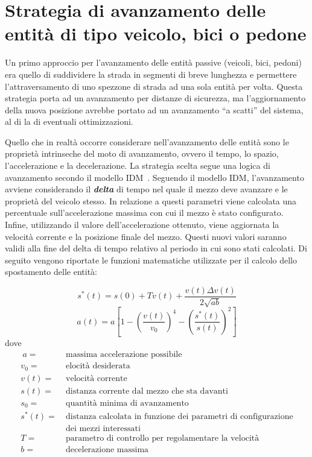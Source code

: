 \section{Strategia di avanzamento delle entità di tipo veicolo, bici o pedone}
Un primo approccio per l'avanzamento delle entità passive (veicoli, bici,
pedoni) era quello di suddividere la strada in segmenti di breve lunghezza e
permettere l'attraversamento di uno spezzone di strada ad una sola entità per
volta.
Questa strategia porta ad un avanzamento per distanze di sicurezza, ma
l'aggiornamento della nuova posizione avrebbe portato ad un avanzamento ``a
scatti'' del sistema, al di la di eventuali ottimizzazioni.

Quello che in realtà occorre considerare nell'avanzamento delle entità sono le
proprietà intrinseche del moto di avanzamento, ovvero il tempo, lo spazio,
l'accelerazione e la decelerazione. La strategia scelta segue una logica di
avanzamento secondo il modello \ac{IDM}~\cite{treiber2000microscopic}.
Seguendo il modello \ac{IDM}, l'avanzamento avviene considerando il
\textbf{\textit{delta}} di tempo nel quale il mezzo deve avanzare e le proprietà
del veicolo stesso. In relazione a questi parametri viene calcolata una
percentuale sull'accelerazione massima con cui il mezzo è stato configurato.
Infine, utilizzando il valore dell'accelerazione ottenuto, viene aggiornata la
velocità corrente e la posizione finale del mezzo.
Questi nuovi valori saranno validi alla fine del delta di tempo relativo al
periodo in cui sono stati calcolati. Di seguito vengono riportate le funzioni
matematiche utilizzate per il calcolo dello spostamento delle entità:

\begin{equation}
s^{*}(t)=s(0)+Tv(t)+\frac{v(t)\Delta{v(t)}}{2\sqrt{ab}}
\end{equation}
\begin{equation}
a(t)=a[1-(\frac{v(t)}{v_{0}})^4-(\frac{s^{*}(t)}{s(t)})^2]
\end{equation}
dove
\begin{align*}
~a =&~\text{massima accelerazione possibile}\\
v_{0} =&~ \text{elocità desiderata} \\
v(t) =&~ \text{velocità corrente} \\
s(t) =&~ \text{distanza corrente dal mezzo che sta davanti} \\
s_{0} =&~ \text{quantità minima di avanzamento} \\
s^*(t) =&~ \text{distanza calcolata in funzione dei parametri di configurazione}
\\ &~ \text{dei mezzi interessati} \\
T =&~ \text{parametro di controllo per regolamentare la velocità} \\
b =&~ \text{decelerazione massima}
\end{align*}

